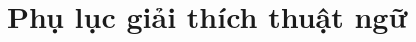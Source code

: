 \documentclass[11pt]{article}
\begin{document}


\clearpage
\appendix
\section{Phụ lục giải thích thuật ngữ} \label{app:glossary}
\end{document}
